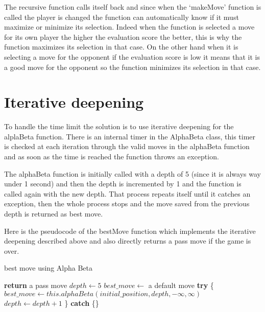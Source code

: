 The recursive function calls itself back and since when the `makeMove' function is called the player is changed the function can automatically know if it must maximize or minimize its selection.
Indeed when the function is selected a move for its own player the higher the evaluation score the better, this is why the function maximizes its selection in that case.
On the other hand when it is selecting a move for the opponent if the evaluation score is low it means that it is a good move for the opponent so the function minimizes its selection in that case.

\section{Iterative deepening}

To handle the time limit the solution is to use iterative deepening for the alplaBeta function.
There is an internal timer in the AlphaBeta class, this timer is checked at each iteration through the valid moves in the alphaBeta function and as soon as the time is reached the function throws an exception.

The alphaBeta function is initially called with a depth of 5 (since it is always way under 1 second) and then the depth is incremented by 1 and the function is called again with the new depth.
That process repeats itself until it catches an exception, then the whole process stops and the move saved from the previous depth is returned as best move.

Here is the pseudocode of the bestMove function which implements the iterative deepening described above and also directly returns a pass move if the game is over.

\FloatBarrier
\begin{algorithm}
    \caption{best move using Alpha Beta}
    \begin{algorithmic}[1]
                \State \textbf{return} a pass move
            \EndIf
            \State $depth \gets 5$
            \State $best\_move \gets$ a default move
                \State \textbf{try} \{
                    \State $best\_move \gets this.alphaBeta(initial\_position, depth, -\infty, \infty)$
                    \State $depth \gets depth + 1$
                \State \} \textbf{catch} \{\}
            \EndWhile
        \EndProcedure
    \end{algorithmic}
\end{algorithm}
\FloatBarrier

